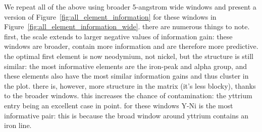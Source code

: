 \documentclass[a4paper,fleqn,usenatbib]{mnras}
\begin{document}
We repeat all of the above using broader 5-angstrom wide windows and present a version of Figure~\ref{fig:all_element_information} for these windows in Figure~\ref{fig:all_element_information_wide}. there are numerous things to note. first, the scale extends to larger negative values of information gain: these windows are broader, contain more information and are therefore more predictive. the optimal first element is now neodymium, not nickel, but the structure is still similar: the most informative elements are the iron-peak and alpha group, and these elements also have the most similar information gains and thus cluster in the plot. there is, however, more structure in the matrix (it's less blocky), thanks to the broader windows. this increases the chance of contamination: the yttrium entry being an excellent case in point. for these windows Y-Ni is the most informative pair: this is because the broad window around yttrium contains an iron line.
\end{document}
